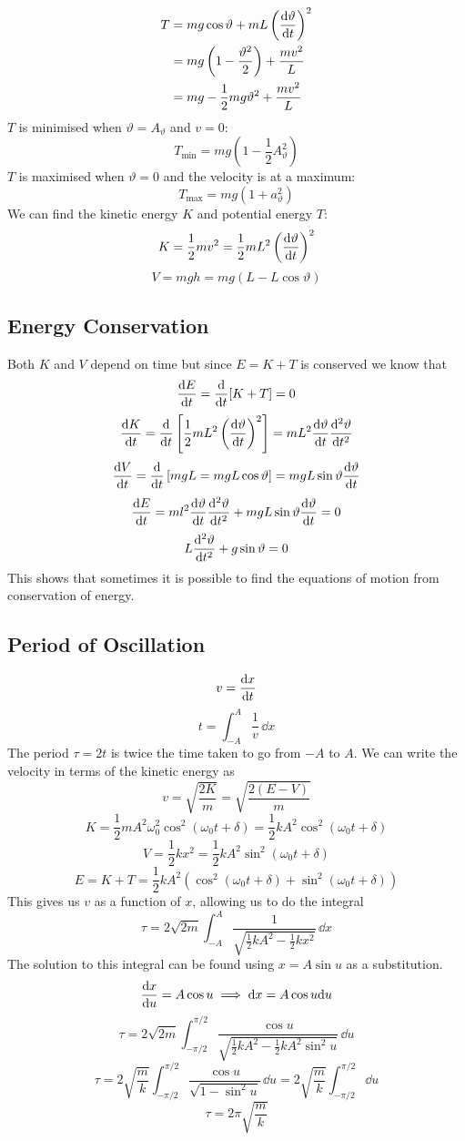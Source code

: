 \documentclass{article}
\begin{document}
    \begin{align*}
        T &= mg\cos\vartheta + mL\left(\dv{\vartheta}{t}\right)^2\\
        &= mg\left(1 - \frac{\vartheta^2}{2}\right) + \frac{mv^2}{L}\\
        &= mg - \frac{1}{2}mg\vartheta^2 + \frac{mv^2}{L}
    \end{align*}
    \(T\) is minimised when \(\vartheta = A_\vartheta\) and \(v = 0\):
    \[T_\text{min} = mg\left(1 - \frac{1}{2}A_\vartheta^2\right)\]
    \(T\) is maximised when \(\vartheta = 0\) and the velocity is at a maximum:
    \[T_\text{max} = mg\left(1 + a_\vartheta^2\right)\]
    We can find the kinetic energy \(K\) and potential energy \(T\):
    \[K = \frac{1}{2}mv^2 = \frac{1}{2}mL^2\left(\dv{\vartheta}{t}\right)^2\]
    \[V = mgh = mg(L - L\cos\vartheta)\]
    
    \subsection{Energy Conservation}
    Both \(K\) and \(V\) depend on time but since \(E = K + T\) is conserved we know that
    \[\dv{E}{t} = \dv{t}[K + T] = 0\]
    \[\dv{K}{t} = \dv{t}\left[\frac{1}{2}mL^2 \left(\dv{\vartheta}{t}\right)^2\right] = mL^2\dv{\vartheta}{t}\dv[2]{\vartheta}{t}\]
    \[\dv{V}{t} = \dv{t}\left[mgL = mgL\cos\vartheta\right] = mgL\sin\vartheta\dv{\vartheta}{t}\]
    \[\dv{E}{t} = ml^2\dv{\vartheta}{t}\dv[2]{\vartheta}{t} + mgL\sin\vartheta\dv{\vartheta}{t} = 0\]
    \[L\dv[2]{\vartheta}{t} + g\sin\vartheta = 0\]
    This shows that sometimes it is possible to find the equations of motion from conservation of energy.
    
    \subsection{Period of Oscillation}
    \[v = \dv{x}{t}\]
    \[t = \int_{-A}^A\frac{1}{v}\,\dd x\]
    The period \(\tau = 2t\) is twice the time taken to go from \(-A\) to \(A\).
    We can write the velocity in terms of the kinetic energy as
    \[v = \sqrt{\frac{2K}{m}} = \sqrt{\frac{2(E - V)}{m}}\]
    \[K = \frac{1}{2}mA^2\omega_0^2\cos^2(\omega_0 t + \delta) = \frac{1}{2}kA^2\cos^2(\omega_0 t + \delta)\]
    \[V = \frac{1}{2}kx^2 = \frac{1}{2}kA^2\sin^2(\omega_0 t + \delta)\]
    \[E = K + T = \frac{1}{2}kA^2(\cos^2(\omega_0 t + \delta) + \sin^2(\omega_0 t + \delta))\]
    This gives us \(v\) as a function of \(x\), allowing us to do the integral
    \[\tau = 2\sqrt{2m}\int_{-A}^A\frac{1}{\sqrt{\frac{1}{2}kA^2 - \frac{1}{2}kx^2}}\,\dd x\]
    The solution to this integral can be found using \(x = A\sin u\) as a substitution.
    \[\dv{x}{u} = A\cos u \implies \dd x = A\cos u\dd u\]
    \[\tau = 2\sqrt{2m}\int_{-\pi/2}^{\pi/2}\frac{\cos u}{\sqrt{\frac{1}{2}kA^2 - \frac{1}{2}kA^2\sin^2u}}\,\dd u\]
    \[\tau = 2\sqrt{\frac{m}{k}}\int_{-\pi/2}^{\pi/2}\frac{\cos u}{\sqrt{
    1 - \sin^2 u}}\,\dd u = 2\sqrt{\frac{m}{k}}\int_{-\pi/2}^{\pi/2}\dd u\]
    \[\tau = 2\pi\sqrt{\frac{m}{k}}\]
    
\end{document}
